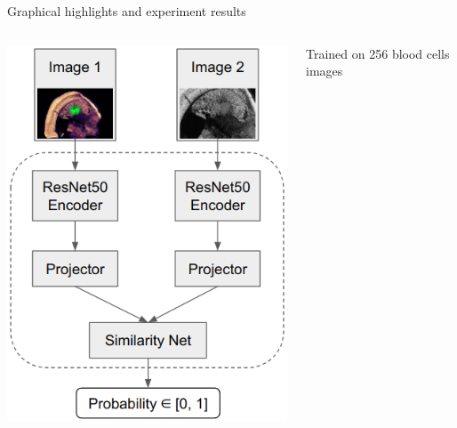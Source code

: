 \documentclass[]{beamer}
\begin{document}
\begin{frame}{Graphical highlights and experiment results}
\bigskip
\begin{columns}
    \begin{column}{0.45\textwidth}
        \includegraphics[width=1\textwidth]{model.png}
    \end{column}
    \begin{column}{0.55\textwidth}
        Trained on 256 blood cells images
        \begin{table}
            \centering
\end{table}
\end{column}
\end{columns}
\end{frame}
\end{document}
